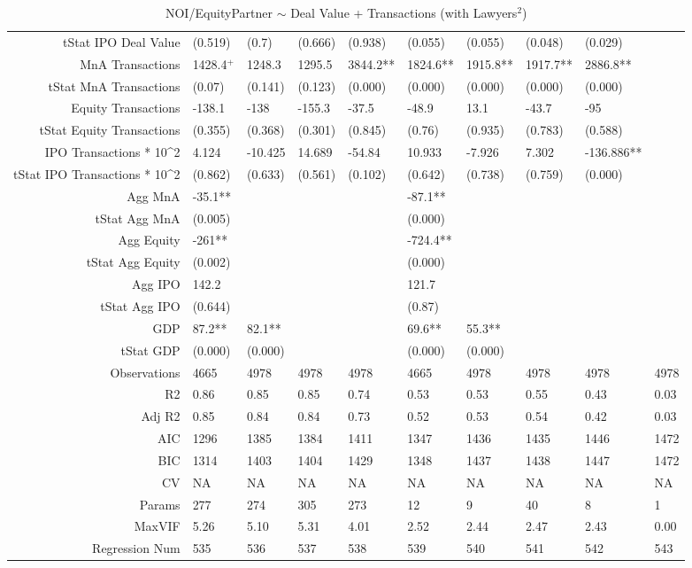 \begin{table}[ht]
\begin{tabular}{rlllllllll}
  tStat IPO Deal Value & (0.519) & (0.7) & (0.666) & (0.938) & (0.055) & (0.055) & (0.048) & (0.029) &  \\ 
  MnA Transactions & 1428.4$^{+}$ & 1248.3 & 1295.5 & 3844.2** & 1824.6** & 1915.8** & 1917.7** & 2886.8** &  \\ 
  tStat MnA Transactions & (0.07) & (0.141) & (0.123) & (0.000) & (0.000) & (0.000) & (0.000) & (0.000) &  \\ 
  Equity Transactions & -138.1 & -138 & -155.3 & -37.5 & -48.9 & 13.1 & -43.7 & -95 &  \\ 
  tStat Equity Transactions & (0.355) & (0.368) & (0.301) & (0.845) & (0.76) & (0.935) & (0.783) & (0.588) &  \\ 
  IPO Transactions * 10^2 & 4.124 & -10.425 & 14.689 & -54.84 & 10.933 & -7.926 & 7.302 & -136.886** &  \\ 
  tStat IPO Transactions * 10^2 & (0.862) & (0.633) & (0.561) & (0.102) & (0.642) & (0.738) & (0.759) & (0.000) &  \\ 
  Agg MnA & -35.1** &  &  &  & -87.1** &  &  &  &  \\ 
  tStat Agg MnA & (0.005) &  &  &  & (0.000) &  &  &  &  \\ 
  Agg Equity & -261** &  &  &  & -724.4** &  &  &  &  \\ 
  tStat Agg Equity & (0.002) &  &  &  & (0.000) &  &  &  &  \\ 
  Agg IPO & 142.2 &  &  &  & 121.7 &  &  &  &  \\ 
  tStat Agg IPO & (0.644) &  &  &  & (0.87) &  &  &  &  \\ 
  GDP & 87.2** & 82.1** &  &  & 69.6** & 55.3** &  &  &  \\ 
  tStat GDP & (0.000) & (0.000) &  &  & (0.000) & (0.000) &  &  &  \\ 
  Observations & 4665 & 4978 & 4978 & 4978 & 4665 & 4978 & 4978 & 4978 & 4978 \\ 
  R2 & 0.86 & 0.85 & 0.85 & 0.74 & 0.53 & 0.53 & 0.55 & 0.43 & 0.03 \\ 
  Adj R2 & 0.85 & 0.84 & 0.84 & 0.73 & 0.52 & 0.53 & 0.54 & 0.42 & 0.03 \\ 
  AIC & 1296 & 1385 & 1384 & 1411 & 1347 & 1436 & 1435 & 1446 & 1472 \\ 
  BIC & 1314 & 1403 & 1404 & 1429 & 1348 & 1437 & 1438 & 1447 & 1472 \\ 
  CV & NA & NA & NA & NA & NA & NA & NA & NA & NA \\ 
  Params & 277 & 274 & 305 & 273 & 12 & 9 & 40 & 8 & 1 \\ 
  MaxVIF & 5.26 & 5.10 & 5.31 & 4.01 & 2.52 & 2.44 & 2.47 & 2.43 & 0.00 \\ 
  Regression Num & 535 & 536 & 537 & 538 & 539 & 540 & 541 & 542 & 543 \\ 
   \hline
\end{tabular}
\caption{NOI/EquityPartner $\sim$ Deal Value + Transactions (with Lawyers$^2$)} 
\end{table}
